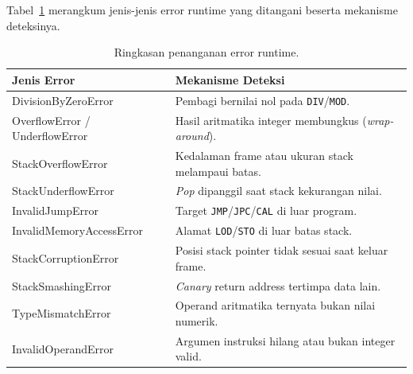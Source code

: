Tabel~\ref{tab:err} merangkum jenis-jenis error runtime yang ditangani beserta
mekanisme deteksinya.

\begin{table}[H]
\centering
\caption{Ringkasan penanganan error runtime.}
\label{tab:err}
\renewcommand{\arraystretch}{1.15}
\begin{tabularx}{\textwidth}{@{}l X@{}}
\toprule
\textbf{Jenis Error} & \textbf{Mekanisme Deteksi} \\
\midrule
DivisionByZeroError      & Pembagi bernilai nol pada \texttt{DIV}/\texttt{MOD}. \\
OverflowError / UnderflowError & Hasil aritmatika integer membungkus (\emph{wrap-around}). \\
StackOverflowError       & Kedalaman frame atau ukuran stack melampaui batas. \\
StackUnderflowError      & \emph{Pop} dipanggil saat stack kekurangan nilai. \\
InvalidJumpError         & Target \texttt{JMP}/\texttt{JPC}/\texttt{CAL} di luar program. \\
InvalidMemoryAccessError & Alamat \texttt{LOD}/\texttt{STO} di luar batas stack. \\
StackCorruptionError     & Posisi stack pointer tidak sesuai saat keluar frame. \\
StackSmashingError       & \emph{Canary} return address tertimpa data lain. \\
TypeMismatchError        & Operand aritmatika ternyata bukan nilai numerik. \\
InvalidOperandError      & Argumen instruksi hilang atau bukan integer valid. \\
\bottomrule
\end{tabularx}
\end{table}
